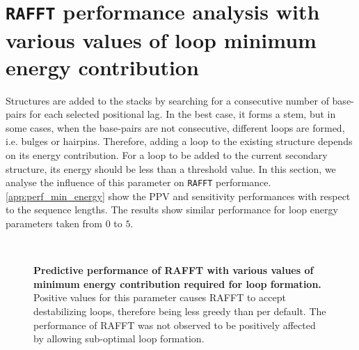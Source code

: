 \section{\texttt{RAFFT} performance analysis with various values of loop minimum energy contribution}
Structures are added to the stacks by searching for a consecutive number of base-pairs for each selected positional lag. In the best case, it forms a stem, but in some cases, when the base-pairs are not consecutive, different loops are formed, i.e. bulges or hairpins. Therefore, adding a loop to the existing structure depends on its energy contribution. For a loop to be added to the current secondary structure, its energy should be less than a threshold value. In this section, we analyse the influence of this parameter on \texttt{RAFFT} performance. \autoref{app:perf_min_energy} show the \ac{PPV} and sensitivity performances with respect to the sequence lengths. The results show similar performance for loop energy parameters taken from $0$ to $5$.
\begin{figure}[t!]
	\\
	\caption{\textbf{Predictive performance of RAFFT with various values of minimum energy contribution required for loop formation\label{app:perf_min_energy}.}
	Positive values for this parameter causes RAFFT to accept destabilizing loops, therefore being less greedy than per default. The performance of RAFFT was not observed to be positively affected by allowing sub-optimal loop formation.}
\end{figure}


